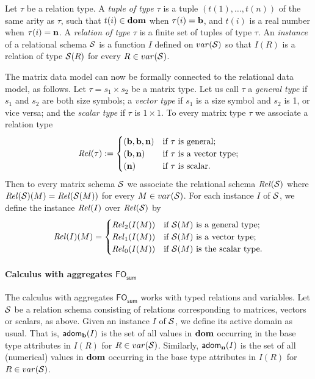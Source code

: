 Let $\tau$ be a relation type. A \emph{tuple
of type $\tau$} is a tuple $(t(1),\dots,t(n))$ of the same arity
as $\tau$, such that $t(i) \in \mathbf{dom}$ when $\tau(i) = \mathbf{b}$, and
$t(i)$ is a real number when $\tau(i) = \mathbf{n}$.
A \emph{relation of type
$\tau$} is a finite set of tuples of type $\tau$.  
An \emph{instance} of a relational schema $\mathcal{S}$ is a
function $I$ defined on $var(\mathcal{S})$ so that $I(R)$ is a relation
of type $\mathcal{S}(R)$ for every $R \in var(\mathcal{S})$.

The matrix data model can now be formally connected to the relational data
model, as follows. Let $\tau = s_1\times s_2$ be a matrix type.  Let us call $\tau$ a
\emph{general type} if $s_1$ and $s_2$ are both size symbols; a
\emph{vector type} if $s_1$ is a size symbol and $s_2$ is 1, or
vice versa; and the \emph{scalar type} if $\tau$ is $1\times 1$.
To every matrix type $\tau$ we associate a relation type
$$ \mathit{Rel}(\tau) := \begin{cases}
(\mathbf{b},\mathbf{b},\mathbf{n}) & \text{if $\tau$ is general;} \\
(\mathbf{b},\mathbf{n}) & \text{if $\tau$ is a vector type;} \\
(\mathbf{n}) & \text{if $\tau$ is scalar.} \end{cases} $$
Then to every matrix schema $\mathcal{S}$ we associate the relational
schema $\mathit{Rel}(\mathcal{S})$ where $\mathit{Rel}(\mathcal{S})(M) = \mathit{Rel}(\mathcal{S}(M))$ for
every $M \in var(\mathcal{S})$.  For each instance $I$ of
$\mathcal{S}$, we define the instance $\mathit{Rel}(I)$ over
$\mathit{Rel}(\mathcal{S})$ by $$ \mathit{Rel}(I)(M) = \begin{cases} 
\mathit{Rel}_2(I(M)) & \text{if $\mathcal{S}(M)$ is a general type;} \\
\mathit{Rel}_1(I(M)) & \text{if $\mathcal{S}(M)$ is a vector type;} \\
\mathit{Rel}_0(I(M)) & \text{if $\mathcal{S}(M)$ is the scalar type.}
\end{cases} $$  

\newcommand{\adom}{\textsf{adom}}
\paragraph{Calculus with aggregates  $\textsf{FO}_{\textsf{sum}}$}
The calculus with aggregates  $\textsf{FO}_{\textsf{sum}}$ works with typed relations and variables. Let $\mathcal{S}$ be a relation schema consisting of relations corresponding to
matrices, vectors or scalars, as above.
Given an instance $I$ of $\mathcal{S}$, we define its active domain as usual. That is, $\adom_{\Tb}(I)$ is the set of all values in $\mathbf{dom}$ occurring in the base  type attributes in $I(R)$ for $R\in var(\mathcal{S})$. Similarly, $\adom_{\Tn}(I)$ is the set of all (numerical) values in $\mathbf{dom}$ occurring in the base  type attributes in $I(R)$ for $R\in var(\mathcal{S})$.

